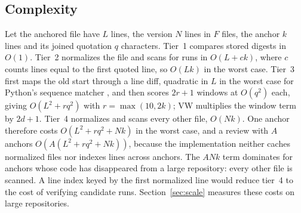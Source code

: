 \subsection{Complexity}\label{sec:complexity}
Let the anchored file have $L$ lines, the version $N$ lines in $F$ files, the anchor $k$ lines and its joined quotation $q$ characters. Tier~1 compares stored digests in $O(1)$. Tier~2 normalizes the file and scans for runs in $O(L + ck)$, where $c$ counts lines equal to the first quoted line, so $O(Lk)$ in the worst case. Tier~3 first maps the old start through a line diff, quadratic in $L$ in the worst case for Python's sequence matcher \cite{pythonsequence}, and then scores $2r+1$ windows at $O(q^2)$ each, giving $O(L^2 + rq^2)$ with $r=\max(10,2k)$; VW multiplies the window term by $2d+1$. Tier~4 normalizes and scans every other file, $O(Nk)$. One anchor therefore costs $O(L^2 + rq^2 + Nk)$ in the worst case, and a review with $A$ anchors $O\!\left(A(L^2 + rq^2 + Nk)\right)$, because the implementation neither caches normalized files nor indexes lines across anchors. The $ANk$ term dominates for anchors whose code has disappeared from a large repository: every other file is scanned. A line index keyed by the first normalized line would reduce tier~4 to the cost of verifying candidate runs. Section~\ref{sec:scale} measures these costs on large repositories.
